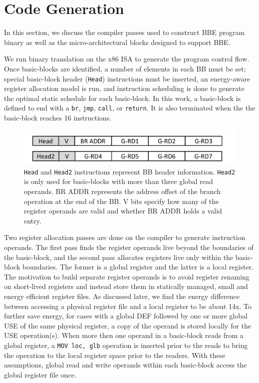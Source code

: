 \section{Code Generation}
\label{sec:code_gen}

In this section, we discuss the compiler passes used to construct BBE program
binary as well as the micro-architectural blocks designed to support BBE.

We run binary translation on the x86 ISA to generate the program control flow.
Once basic-blocks are identified, a number of elements in each BB must be set;
special basic-block header (\texttt{Head}) instructions must be inserted, an
energy-aware register allocation model is run, and instruction scheduling is
done to generate the optimal static schedule for each basic-block.  In this
work, a basic-block is defined to end with a \texttt{br}, \texttt{jmp},
    \texttt{call}, or \texttt{return}. It is also terminated when the the
    basic-block reaches 16 instructions. %

\begin{figure}
	\centering
	\includegraphics[width=1.0\columnwidth]{fig/header_ins.pdf} 
    \caption{\texttt{Head} and \texttt{Head2} instructions represent BB
        header information. \texttt{Head2} is only used for basic-blocks with
            more than three global read operands. BR ADDR represents the address
            offset of the branch operation at the end of the BB. V bits specify
            how many of the register operands are valid and whether BR ADDR
            holds a valid entry.}
	\label{fig:header_ins}
\end{figure}

Two register allocation passes are done on the compiler to generate instruction
operands. The first pass finds the register operands live beyond the boundaries
of the basic-block, and the second pass allocates registers live only within the
basic-block boundaries. The former is a global register and the latter is a
local register. The motivation to build separate register operands is to avoid
register renaming on short-lived registers and instead store them in statically
managed, small and energy efficient register files. As discussed later, we find
the energy difference between accessing a physical register file and a local
register to be about 14x. To further save energy, for cases with a global DEF
followed by one or more global USE of the same physical register, a copy of the
operand is stored locally for the USE operation(s). When more then one operand
in a basic-block reads from a global register, a \texttt{MOV loc, glb}
operation is inserted prior to the reads to bring the operation to the local
register space prior to the readers. With these assumptions, global read and
write operands within each basic-block access the global register file once.


